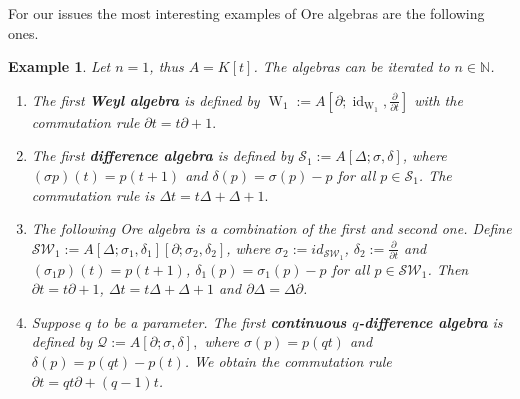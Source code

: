 \documentclass[a4paper,10pt]{article}
\newtheorem{ex}[Th]{Example}
\theoremstyle{nonumberplain}
\newcommand{\N}{\mathbb{N}}
\DeclareMathOperator{\W}{W}
\DeclareMathOperator{\id}{id}
\begin{document}
For our issues the most interesting examples of Ore algebras are the following ones.


\begin{ex}\label{interestingAlgebras} 
Let $n=1$, thus $A=K[t]$. The algebras can be iterated to $n \in \N$.
\begin{enumerate}
\item The first \textbf{Weyl algebra} is defined by
$\W_1:= A[ \partial; \id_{ \W_1}, \frac{\partial}{\partial t}]$
with the commutation rule $ \partial  t = t \partial + 1 .$
\item The first \textbf{difference algebra} is defined by
$ \mathcal{S}_1 :=A \left[ \Delta; \sigma, \delta \right]$,
where $ (\sigma p)(t) =  p(t + 1)$ and $\delta(p)=\sigma(p)-p$ for all 
$p \in \mathcal{S}_1$. The commutation rule is
$ \Delta t = t \Delta + \Delta + 1.$
\item The following Ore algebra is a combination of the first and second one. Define
$\mathcal{SW}_1:=A \left[ \Delta; \sigma_1, \delta_1 \right]\left[ \partial; \sigma_2, \delta_2 \right]$,
where $\sigma_2:=id_{ \mathcal{SW}_1 }$, $\delta_2:=\frac{\partial}{\partial t}$ and $ (\sigma_1 p)(t) = p(t + 1)$, 
$\delta_1(p)=\sigma_1(p)-p$ for all $p \in \mathcal{SW}_1$. Then $ \partial t = t \partial + 1$,
$\Delta t = t \Delta + \Delta +1$ and $\partial \Delta = \Delta \partial$.
\item Suppose $q$ to be a parameter. The first \textbf{continuous $q$-difference algebra} is defined by
$ \mathcal{Q}:= A [\partial; \sigma, \delta], $
where $\sigma( p )=p(q t)$ and $\delta(p)= p(qt)-p(t)$. We obtain the commutation rule
$ \partial t = qt \partial + (q-1)t$.
\end{enumerate}
\end{ex}

\end{document}
